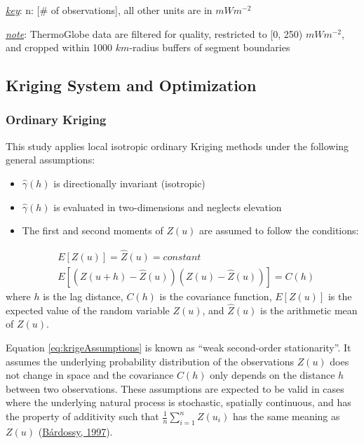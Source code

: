 \begin{table}
\begin{threeparttable}
\begin{tabular}[t]{lrrrrrrr}
\bottomrule
\end{tabular}
\begin{tablenotes}
\item \uline{\textit{key}}: n: [\# of observations], all other units are in $mWm^{-2}$
\item \uline{\textit{note}}: ThermoGlobe data are filtered for quality, restricted to [0, 250) $mWm^{-2}$, and cropped within 1000 $km$-radius buffers of segment boundaries
\end{tablenotes}
\end{threeparttable}
\end{table}

\clearpage

\hypertarget{krigeOpt}{%
\subsection{Kriging System and Optimization}\label{krigeOpt}}

\hypertarget{ordinary-kriging}{%
\subsubsection{Ordinary Kriging}\label{ordinary-kriging}}

This study applies local isotropic ordinary Kriging methods under the following general assumptions:

\begin{itemize}
\tightlist
\item
  \(\hat{\gamma}(h)\) is directionally invariant (isotropic)
\item
  \(\hat{\gamma}(h)\) is evaluated in two-dimensions and neglects elevation
\item
  The first and second moments of \(Z(u)\) are assumed to follow the conditions:
\end{itemize}

\begin{equation}
  \begin{aligned}
    &E[Z(u)] = \hat{Z}(u) = constant \\
    &E[(Z(u + h) - \hat{Z}(u))(Z(u) - \hat{Z}(u))] = C(h)
  \end{aligned}
  \label{eq:krigeAssumptions}
\end{equation}
where \(h\) is the lag distance, \(C(h)\) is the covariance function, \(E[Z(u)]\) is the expected value of the random variable \(Z(u)\), and \(\hat{Z}(u)\) is the arithmetic mean of \(Z(u)\).

Equation \eqref{eq:krigeAssumptions} is known as ``weak second-order stationarity''. It assumes the underlying probability distribution of the observations \(Z(u)\) does not change in space and the covariance \(C(h)\) only depends on the distance \(h\) between two observations. These assumptions are expected to be valid in cases where the underlying natural process is stochastic, spatially continuous, and has the property of additivity such that \(\frac{1}{n}\sum_{i=1}^n Z(u_i)\) has the same meaning as \(Z(u)\) (\protect\hyperlink{ref-bardossy1997}{Bárdossy, 1997}).

